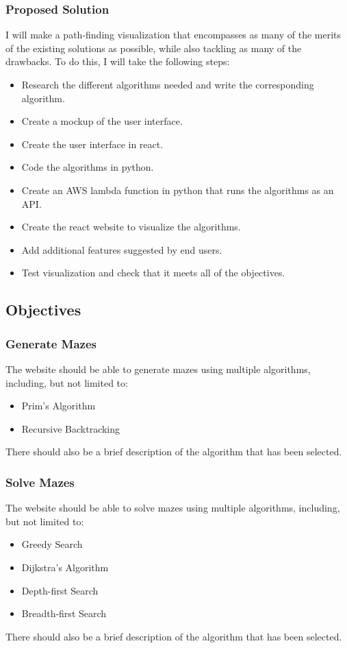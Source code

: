 \documentclass[titlepage]{article}
\begin{document}
\subsubsection{Proposed Solution}
I will make a path-finding visualization that encompasses as many of the merits of the existing solutions as possible, while also tackling as many of the drawbacks. To do this, I will take the following steps:
\begin{itemize}
    \item Research the different algorithms needed and write the corresponding algorithm.
    \item Create a mockup of the user interface.
    \item Create the user interface in react.
    \item Code the algorithms in python.
    \item Create an AWS lambda function in python that runs the algorithms as an API.
    \item Create the react website to visualize the algorithms.
    \item Add additional features suggested by end users.
    \item Test visualization and check that it meets all of the objectives.
\end{itemize}

\subsection{Objectives}
\subsubsection{Generate Mazes}
The website should be able to generate mazes using multiple algorithms, including, but not limited to:
\begin{itemize}
    \item Prim's Algorithm
    \item Recursive Backtracking
\end{itemize}
There should also be a brief description of the algorithm that has been selected.

\subsubsection{Solve Mazes}
The website should be able to solve mazes using multiple algorithms, including, but not limited to:
\begin{itemize}
    \item Greedy Search
    \item Dijkstra's Algorithm
    \item Depth-first Search
    \item Breadth-first Search
\end{itemize}
There should also be a brief description of the algorithm that has been selected.
\end{document}
